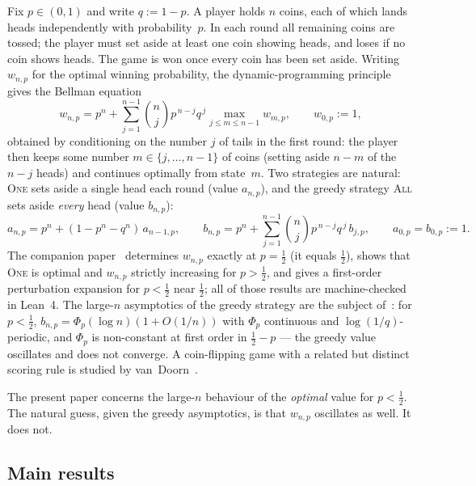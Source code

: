 \documentclass[11pt]{article}
\theoremstyle{definition}
\newcommand{\One}{\textsc{One}}
\newcommand{\All}{\textsc{All}}
\begin{document}
Fix $p\in(0,1)$ and write $q:=1-p$.  A player holds $n$ coins, each of
which lands heads independently with probability~$p$.  In each round
all remaining coins are tossed; the player must set aside at least one
coin showing heads, and loses if no coin shows heads.  The game is won
once every coin has been set aside.  Writing $w_{n,p}$ for the optimal
winning probability, the dynamic-programming principle gives the
Bellman equation
\begin{equation}\label{eq:bellman}
  w_{n,p}=p^{n}+\sum_{j=1}^{n-1}\binom{n}{j}p^{\,n-j}q^{\,j}
          \max_{j\le m\le n-1}w_{m,p},\qquad w_{0,p}:=1 ,
\end{equation}
obtained by conditioning on the number $j$ of tails in the first
round: the player then keeps some number $m\in\{j,\dots,n-1\}$ of
coins (setting aside $n-m$ of the $n-j$ heads) and continues
optimally from state~$m$.  Two strategies are natural: \One{} sets
aside a single head each round (value $a_{n,p}$), and the greedy
strategy \All{} sets aside \emph{every} head (value $b_{n,p}$):
\begin{equation}\label{eq:abrec}
  a_{n,p}=p^{n}+(1-p^{n}-q^{n})\,a_{n-1,p},
  \qquad
  b_{n,p}=p^{n}+\sum_{j=1}^{n-1}\binom{n}{j}p^{\,n-j}q^{\,j}\,b_{j,p},
  \qquad a_{0,p}=b_{0,p}:=1 .
\end{equation}
The companion paper~\cite{Paper1} determines $w_{n,p}$ exactly at
$p=\tfrac12$ (it equals $\tfrac12$), shows that \One{} is optimal and
$w_{n,p}$ strictly increasing for $p>\tfrac12$, and gives a
first-order perturbation expansion for $p<\tfrac12$ near $\tfrac12$;
all of those results are machine-checked in Lean~4.  The large-$n$
asymptotics of the greedy strategy are the subject of~\cite{Paper2}:
for $p<\tfrac12$, $b_{n,p}=\Phi_p(\log n)(1+O(1/n))$ with $\Phi_p$
continuous and $\log(1/q)$-periodic, and $\Phi_p$ is non-constant at
first order in $\tfrac12-p$ --- the greedy value oscillates and does
not converge.  A coin-flipping game with a related but distinct
scoring rule is studied by van~Doorn~\cite{vanDoorn}.

The present paper concerns the large-$n$ behaviour of the
\emph{optimal} value for $p<\tfrac12$.  The natural guess, given the
greedy asymptotics, is that $w_{n,p}$ oscillates as well.  It does
not.

\subsection{Main results}\label{sec:main}
\end{document}
